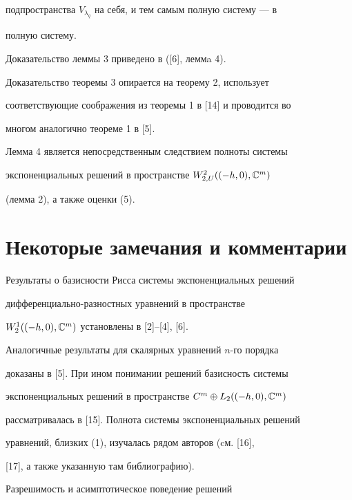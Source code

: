 подпространства $V_{\lambda_q}$ на себя, и тем самым полную систему --- в 


полную систему. 


 


Доказательство леммы 3 приведено в ([6], леммa 4). 


 


Доказательство теоремы 3 опирается на теорему 2, использует 


соответствующие соображения из теоремы 1 в [14] и проводится во 


многом аналогично теореме 1 в [5]. 


 


Лемма 4 является непосредственным следствием полноты системы 


экспоненциальных решений в пространстве $W^{2}_{2,U}((-h,0),\Bbb C^m)$ 


(лемма 2), а также оценки (5). 


 


\section{Некоторые замечания и комментарии} 


 


Результаты о базисности Рисса системы экспоненциальных решений 


дифференциально-разностных уравнений в пространстве 


$W^{1}_{2}((-h,0),\Bbb C^m)$ установлены в [2]--[4], [6]. 


Аналогичные результаты для скалярных уравнений $n$-го порядка 


доказаны в [5]. При ином понимании решений базисность системы 


экспоненциальных решений в пространстве $C^m\oplus L_2((-h,0),\Bbb C^m)$ 


рассматривалась в [15]. Полнота системы экспоненциальных решений 


уравнений, близких (1), изучалась рядом авторов (cм. [16], 


[17], а также указанную там библиографию). 


 


Разрешимость и асимптотическое поведение решений 


